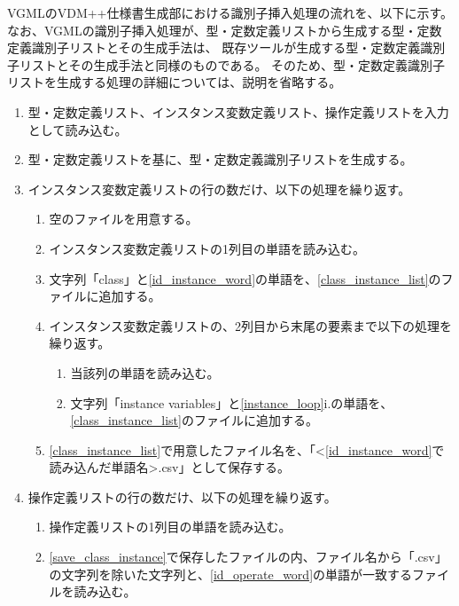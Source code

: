 VGMLのVDM++仕様書生成部における識別子挿入処理の流れを、以下に示す。
なお、VGMLの識別子挿入処理が、型・定数定義リストから生成する型・定数定義識別子リストとその生成手法は、
既存ツールが生成する型・定数定義識別子リストとその生成手法と同様のものである。
そのため、型・定数定義識別子リストを生成する処理の詳細については、説明を省略する。

\begin{enumerate}
    \item 型・定数定義リスト、インスタンス変数定義リスト、操作定義リストを入力として読み込む。
    \item 型・定数定義リストを基に、型・定数定義識別子リストを生成する。
    \item インスタンス変数定義リストの行の数だけ、以下の処理を繰り返す。
        \begin{enumerate}
            \item 空のファイルを用意する。
            \label{class_instance_list}
            \item インスタンス変数定義リストの1列目の単語を読み込む。
            \label{id_instance_word}
            \item 文字列「class」と\ref{id_instance_word}の単語を、\ref{class_instance_list}のファイルに追加する。
            \item インスタンス変数定義リストの、2列目から末尾の要素まで以下の処理を繰り返す。
            \label{instance_loop}
                \begin{enumerate}
                    \item 当該列の単語を読み込む。
                    \label{instance_word}
                    \item 文字列「instance variables」と\ref{instance_loop}i.の単語を、\ref{class_instance_list}のファイルに追加する。
                \end{enumerate}
            \item \ref{class_instance_list}で用意したファイル名を、「\textless \ref{id_instance_word}で読み込んだ単語名\textgreater.csv」として保存する。
            \label{save_class_instance}
        \end{enumerate}
    \item 操作定義リストの行の数だけ、以下の処理を繰り返す。
        \begin{enumerate}
            \item 操作定義リストの1列目の単語を読み込む。
            \label{id_operate_word}
            \item \ref{save_class_instance}で保存したファイルの内、ファイル名から「.csv」の文字列を除いた文字列と、\ref{id_operate_word}の単語が一致するファイルを読み込む。

\end{enumerate}
\end{enumerate}
